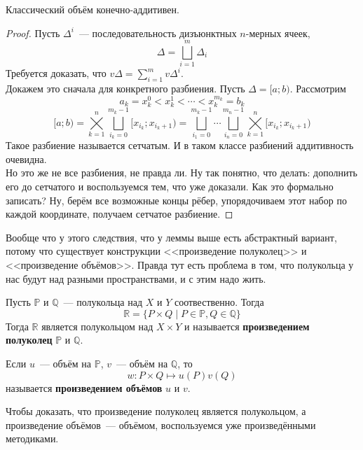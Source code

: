 \documentclass{article}
\begin{document}
    \begin{property}
        Классический объём конечно-аддитивен.
    \end{property}
    \begin{proof}
        Пусть $\Delta^i$~--- последовательность дизъюнктных $n$-мерных ячеек,
        $$
        \Delta=\bigsqcup\limits_{i=1}^m\Delta_i
        $$
        Требуется доказать, что $v\Delta=\sum\limits_{i=1}^mv\Delta^i$.\\
        Докажем это сначала для конкретного разбиения. Пусть $\Delta=[a;b)$. Рассмотрим
        $$
        a_k=x_k^0<x_k^1<\cdots<x_k^{m_k}=b_k
        $$
        $$
        [a;b)=\bigtimes\limits_{k=1}^n\bigsqcup\limits_{i_k=0}^{m_k-1}[x_{i_k};x_{i_k+1})=\bigsqcup\limits_{i_1=0}^{m_k-1}\cdots\bigsqcup\limits_{i_n=0}^{m_n-1}\bigtimes\limits_{k=1}^n[x_{i_k};x_{i_k+1})
        $$
        Такое разбиение называется сетчатым. И в таком классе разбиений аддитивность очевидна.\\
        Но это же не все разбиения, не правда ли. Ну так понятно, что делать: дополнить его до сетчатого и воспользуемся тем, что уже доказали. Как это формально записать? Ну, берём все возможные концы рёбер, упорядочиваем этот набор по каждой координате, получаем сетчатое разбиение.
    \end{proof}
    \begin{remark}
        Вообще что у этого следствия, что у леммы выше есть абстрактный вариант, потому что существует конструкции <<произведение полуколец>> и <<произведение объёмов>>. Правда тут есть проблема в том, что полукольца у нас будут над разными пространствами, и с этим надо жить.
    \end{remark}
    \begin{definition}
        Пусть $\mathbb P$ и $\mathbb Q$~--- полукольца над $X$ и $Y$ соотвественно. Тогда
        $$
        \mathbb R=\{P\times Q\mid P\in\mathbb P,Q\in\mathbb Q\}
        $$
        Тогда $\mathbb R$ является полукольцом над $X\times Y$ и называется \textbf{произведением полуколец} $\mathbb P$ и $\mathbb Q$.
    \end{definition}
    \begin{definition}
        Если $u$~--- объём на $\mathbb P$, $v$~--- объём на $\mathbb Q$, то
        $$
        w\colon P\times Q\mapsto u(P)v(Q)
        $$
        называется \textbf{произведением объёмов} $u$ и $v$.
    \end{definition}
    \begin{remark}
        Чтобы доказать, что произведение полуколец является полукольцом, а произведение объёмов~--- объёмом, воспользуемся уже произведёнными методиками.
    \end{remark}
\end{document}
